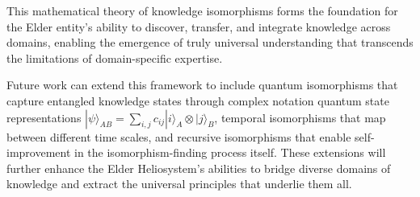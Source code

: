 This mathematical theory of knowledge isomorphisms forms the foundation for the Elder entity's ability to discover, transfer, and integrate knowledge across domains, enabling the emergence of truly universal understanding that transcends the limitations of domain-specific expertise.

Future work can extend this framework to include quantum isomorphisms that capture entangled knowledge states through complex notation quantum state representations $|\psi\rangle_{AB} = \sum_{i,j} c_{ij}|i\rangle_A \otimes |j\rangle_B$, temporal isomorphisms that map between different time scales, and recursive isomorphisms that enable self-improvement in the isomorphism-finding process itself. These extensions will further enhance the Elder Heliosystem's abilities to bridge diverse domains of knowledge and extract the universal principles that underlie them all.